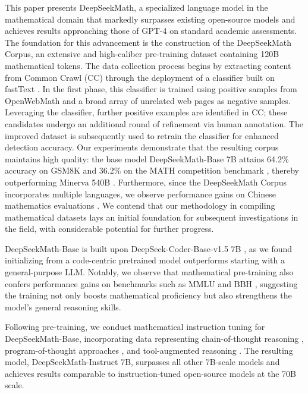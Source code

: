 This paper presents DeepSeekMath, a specialized language model in the mathematical domain that markedly surpasses existing open-source models and achieves results approaching those of GPT-4 on standard academic assessments. The foundation for this advancement is the construction of the DeepSeekMath Corpus, an extensive and high-caliber pre-training dataset containing 120B mathematical tokens. The data collection process begins by extracting content from Common Crawl (CC) through the deployment of a classifier built on fastText \citep{joulin2016fasttext}. In the first phase, this classifier is trained using positive samples from OpenWebMath \citep{openwebmath} and a broad array of unrelated web pages as negative samples. Leveraging the classifier, further positive examples are identified in CC; these candidates undergo an additional round of refinement via human annotation. The improved dataset is subsequently used to retrain the classifier for enhanced detection accuracy. Our experiments demonstrate that the resulting corpus maintains high quality: the base model DeepSeekMath-Base 7B attains 64.2\% accuracy on GSM8K \citep{gsm8k} and 36.2\% on the MATH competition benchmark \citep{MATH}, thereby outperforming Minerva 540B \citep{minerva}. Furthermore, since the DeepSeekMath Corpus incorporates multiple languages, we observe performance gains on Chinese mathematics evaluations \citep{wei2023cmath,agieval}. We contend that our methodology in compiling mathematical datasets lays an initial foundation for subsequent investigations in the field, with considerable potential for further progress.

DeepSeekMath-Base is built upon DeepSeek-Coder-Base-v1.5 7B \citep{deepseek-coder}, as we found initializing from a code-centric pretrained model outperforms starting with a general-purpose LLM. Notably, we observe that mathematical pre-training also confers performance gains on benchmarks such as MMLU \citep{mmlu} and BBH \citep{bbh}, suggesting the training not only boosts mathematical proficiency but also strengthens the model's general reasoning skills.

Following pre-training, we conduct mathematical instruction tuning for DeepSeekMath-Base, incorporating data representing chain-of-thought reasoning \citep{cot}, program-of-thought approaches \citep{pot,pal}, and tool-augmented reasoning \citep{tora}. The resulting model, DeepSeekMath-Instruct 7B, surpasses all other 7B-scale models and achieves results comparable to instruction-tuned open-source models at the 70B scale.

